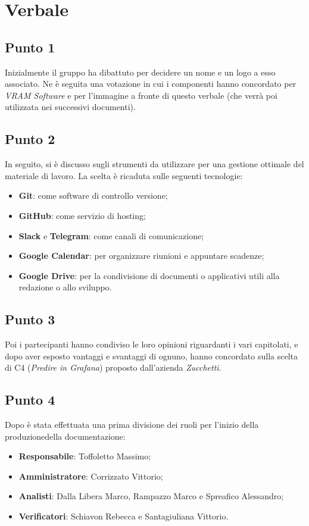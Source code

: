 \section{Verbale}
    \subsection{Punto 1}
        Inizialmente il gruppo ha dibattuto per decidere un nome e un logo a esso associato. Ne è seguita una votazione in cui i componenti hanno
        concordato per \textit{VRAM Software} e per l'immagine a fronte di questo verbale (che verrà poi utilizzata nei successivi documenti).
    \subsection{Punto 2}
        In seguito, si è discusso sugli strumenti da utilizzare per una gestione ottimale del materiale di lavoro. La scelta è ricaduta sulle seguenti tecnologie:
        \begin{itemize}
            \item \textbf{Git}: come software di controllo versione;
            \item \textbf{GitHub}: come servizio di hosting;
            \item \textbf{Slack} e \textbf{Telegram}: come canali di comunicazione;
            \item \textbf{Google Calendar}: per organizzare riunioni e appuntare scadenze;
            \item \textbf{Google Drive}: per la condivisione di documenti o applicativi utili alla redazione o allo sviluppo.
        \end{itemize}
    \subsection{Punto 3}
        Poi i partecipanti hanno condiviso le loro opinioni riguardanti i vari capitolati\glo, e dopo aver esposto vantaggi e svantaggi di ognuno, hanno concordato sulla scelta di C4 (\textit{Predire in Grafana}\glo) proposto dall'azienda \textit{Zucchetti}.
    \subsection{Punto 4}
        Dopo è stata effettuata una prima divisione dei ruoli per l'inizio della produzione\glosp della documentazione:
        \begin{itemize}
            \item \textbf{Responsabile}: Toffoletto Massimo;
            \item \textbf{Amministratore}: Corrizzato Vittorio;
            \item \textbf{Analisti}: Dalla Libera Marco, Rampazzo Marco e Spreafico Alessandro;
            \item \textbf{Verificatori}: Schiavon Rebecca e Santagiuliana Vittorio.
        \end{itemize}
